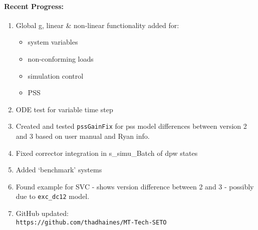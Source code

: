 \documentclass[12pt]{article}
\begin{document}
\begin{multicols}{2}
\raggedright

\paragraph{Recent Progress:}
	\begin{enumerate}
		\itemsep0em 
		\item Global g, linear \& non-linear functionality added for:
		\begin{minipage}{\linewidth}
				\begin{itemize}
		\itemsep0em 
				\footnotesize
					\item system variables
					\item non-conforming loads
					\item simulation control
					\item PSS
				\end{itemize}
		\end{minipage}
		\item ODE test for variable time step\
		\item Created and tested \verb|pssGainFix| for pss model differences between version 2 and 3 based on user manual and Ryan info.
		\item Fixed corrector integration in s\_simu\_Batch of dpw states
		\item Added `benchmark' systems
		\item Found example for SVC - shows version difference between 2 and 3 - possibly due to \verb|exc_dc12| model.
		\item GitHub updated:\\
	{\footnotesize	\verb|https://github.com/thadhaines/MT-Tech-SETO| }\\
	\end{enumerate}
	


\end{multicols}
\end{document}
